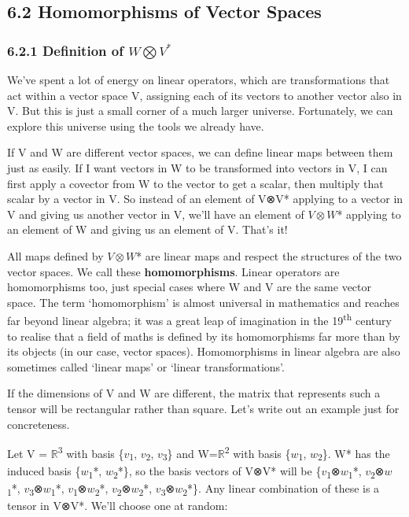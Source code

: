 \documentclass[oneside,english]{amsbook}
\numberwithin{section}{chapter}
\theoremstyle{plain}
\theoremstyle{definition}
\begin{document}
\subsection{6.2 Homomorphisms of Vector
	Spaces}\label{homomorphisms-of-vector-spaces}

\subsubsection{\texorpdfstring{6.2.1 Definition of
		\(W\bigotimes V^{*}\)}{6.2.1 Definition of W\textbackslash bigotimes V\^{}\{*\}}}\label{definition-of-wbigotimes-v}

We've spent a lot of energy on linear operators, which are
transformations that act within a vector space V, assigning each of its
vectors to another vector also in V. But this is just a small corner of
a much larger universe. Fortunately, we can explore this universe using
the tools we already have.

If V and W are different vector spaces, we can define linear maps
between them just as easily. If I want vectors in W to be transformed
into vectors in V, I can first apply a covector from W to the vector to
get a scalar, then multiply that scalar by a vector in V. So instead of
an element of V⊗V* applying to a vector in V and giving us another
vector in V, we'll have an element of $V\otimes W$* applying to an element of W
and giving us an element of V. That's it!

All maps defined by $V\otimes W$* are linear maps and respect the structures of
the two vector spaces. We call these \textbf{homomorphisms}. Linear
operators are homomorphisms too, just special cases where W and V are
the same vector space. The term `homomorphism' is almost universal in
mathematics and reaches far beyond linear algebra; it was a great leap
of imagination in the 19\textsuperscript{th} century to realise that a
field of maths is defined by its homomorphisms far more than by its
objects (in our case, vector spaces). Homomorphisms in linear algebra
are also sometimes called `linear maps' or `linear transformations'.

If the dimensions of V and W are different, the matrix that represents
such a tensor will be rectangular rather than square. Let's write out an
example just for concreteness.

Let V = $\mathbb{R}$\textsuperscript{3} with basis
\{$v$\textsubscript{1}, $v$\textsubscript{2},
$v$\textsubscript{3}\} and W=$\mathbb{R}$\textsuperscript{2} with basis
\{$w$\textsubscript{1}, $w$\textsubscript{2}\}. W* has the induced
basis \{$w$\textsubscript{1}*, $w$\textsubscript{2}*\}, so the
basis vectors of V⊗V* will be
\{$v$\textsubscript{1}⊗$w$\textsubscript{1}*,
$v$\textsubscript{2}⊗$w$\textsubscript{1}*,
$v$\textsubscript{3}⊗$w$\textsubscript{1}*,
$v$\textsubscript{1}⊗$w$\textsubscript{2}*,
$v$\textsubscript{2}⊗$w$\textsubscript{2}*,
$v$\textsubscript{3}⊗$w$\textsubscript{2}*\}. Any linear
combination of these is a tensor in V⊗V*. We'll choose one at random:
\end{document}
